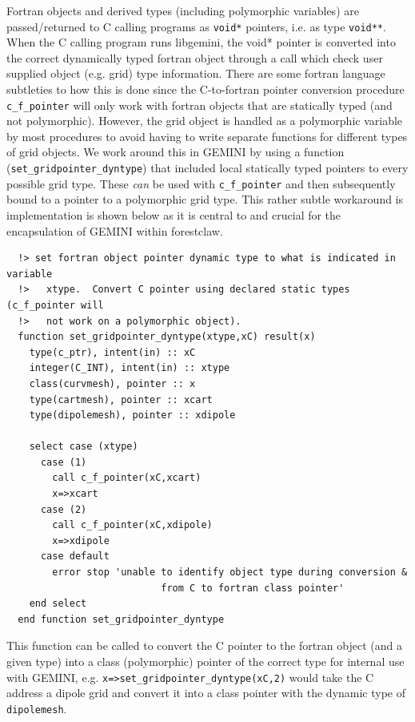 \documentclass[11pt,letterpaper]{article}
\begin{document}
Fortran objects and derived types (including polymorphic variables) are passed/returned to C calling programs as \texttt{void*} pointers, i.e. as type \texttt{void**}.  When the C calling program runs libgemini, the void* pointer is converted into the correct dynamically typed fortran object through a call which check user supplied object (e.g. grid) type information.  There are some fortran language subtleties to how this is done since the C-to-fortran pointer conversion procedure \texttt{c\_f\_pointer} will only work with fortran objects that are statically typed (and not polymorphic).  However, the grid object is handled as a polymorphic variable by most procedures to avoid having to write separate functions for different types of grid objects.  We work around this in GEMINI by using a function (\texttt{set\_gridpointer\_dyntype}) that included local statically typed pointers to every possible grid type.  These \emph{can} be used with \texttt{c\_f\_pointer} and then subsequently bound to a pointer to a polymorphic grid type.  This rather subtle workaround is implementation is shown below as it is central to and crucial for the encapsulation of GEMINI within forestclaw.  

\begin{verbatim}
  !> set fortran object pointer dynamic type to what is indicated in variable 
  !>   xtype.  Convert C pointer using declared static types (c_f_pointer will 
  !>   not work on a polymorphic object).
  function set_gridpointer_dyntype(xtype,xC) result(x)
    type(c_ptr), intent(in) :: xC
    integer(C_INT), intent(in) :: xtype
    class(curvmesh), pointer :: x
    type(cartmesh), pointer :: xcart
    type(dipolemesh), pointer :: xdipole

    select case (xtype)
      case (1)
        call c_f_pointer(xC,xcart)
        x=>xcart
      case (2)
        call c_f_pointer(xC,xdipole)
        x=>xdipole
      case default
        error stop 'unable to identify object type during conversion &
                           from C to fortran class pointer'
    end select
  end function set_gridpointer_dyntype
\end{verbatim}

This function can be called to convert the C pointer to the fortran object (and a given type) into a class (polymorphic) pointer of the correct type for internal use with GEMINI, e.g. \texttt{x=>set\_gridpointer\_dyntype(xC,2)} would take the C address a dipole grid and convert it into a class pointer with the dynamic type of \texttt{dipolemesh}.  
\end{document}
